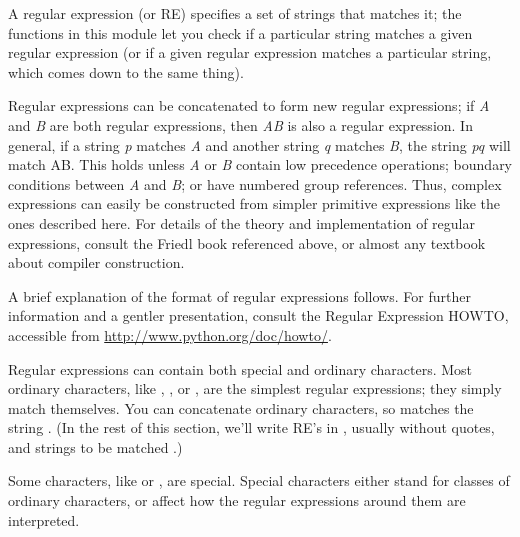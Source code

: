 A regular expression (or RE) specifies a set of strings that matches
it; the functions in this module let you check if a particular string
matches a given regular expression (or if a given regular expression
matches a particular string, which comes down to the same thing).

Regular expressions can be concatenated to form new regular
expressions; if \emph{A} and \emph{B} are both regular expressions,
then \emph{AB} is also a regular expression.  In general, if a string
\emph{p} matches \emph{A} and another string \emph{q} matches \emph{B},
the string \emph{pq} will match AB.  This holds unless \emph{A} or
\emph{B} contain low precedence operations; boundary conditions between
\emph{A} and \emph{B}; or have numbered group references.  Thus, complex
expressions can easily be constructed from simpler primitive
expressions like the ones described here.  For details of the theory
and implementation of regular expressions, consult the Friedl book
referenced above, or almost any textbook about compiler construction.

A brief explanation of the format of regular expressions follows.  For
further information and a gentler presentation, consult the Regular
Expression HOWTO, accessible from \url{http://www.python.org/doc/howto/}.

Regular expressions can contain both special and ordinary characters.
Most ordinary characters, like , , or
, are the simplest regular expressions; they simply match
themselves.  You can concatenate ordinary characters, so 
matches the string .  (In the rest of this section, we'll
write RE's in , usually without quotes, and
strings to be matched .)

Some characters, like \character{|} or \character{(}, are special.
Special characters either stand for classes of ordinary characters, or
affect how the regular expressions around them are interpreted.

